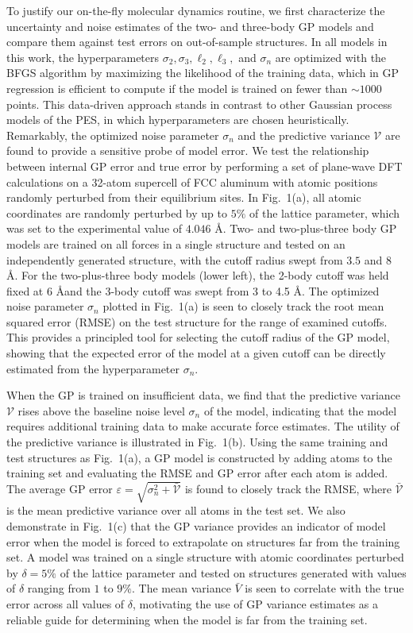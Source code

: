 \documentclass[%
superscriptaddress,
preprint,
linenumbers,
amsmath,amssymb,
aps,
prl,
]{revtex4-1}
\begin{document}
To justify our on-the-fly molecular dynamics routine, we first characterize the uncertainty and noise estimates of the two- and three-body GP models and compare them against test errors on out-of-sample structures. In all models in this work, the hyperparameters $\sigma_2, \sigma_3, \ell_2, \ell_3,$ and $\sigma_n$ are optimized with the BFGS algorithm by maximizing the likelihood of the training data, which in GP regression is efficient to compute if the model is trained on fewer than $\sim 1000$ points. This data-driven approach stands in contrast to other Gaussian process models of the PES, in which hyperparameters are chosen heuristically. Remarkably, the optimized noise parameter $\sigma_n$ and the predictive variance $\mathcal{V}$ are found to provide a sensitive probe of model error. We test the relationship between internal GP error and true error by performing a set of plane-wave DFT calculations on a 32-atom supercell of FCC aluminum with atomic positions randomly perturbed from their equilibrium sites. In Fig.\ 1(a), all atomic coordinates are randomly perturbed by up to $5\%$ of the lattice parameter, which was set to the experimental value of $4.046$ \AA. Two- and two-plus-three body GP models are trained on all forces in a single structure and tested on an independently generated structure, with the cutoff radius swept from $3.5$ and $8$ \AA. For the two-plus-three body models (lower left), the 2-body cutoff was held fixed at $6$ \AA and the 3-body cutoff was swept from 3 to 4.5 \AA. The optimized noise parameter $\sigma_n$ plotted in Fig.\ 1(a) is seen to closely track the root mean squared error (RMSE) on the test structure for the range of examined cutoffs. This provides a principled tool for selecting the cutoff radius of the GP model, showing that the expected error of the model at a given cutoff can be directly estimated from the hyperparameter $\sigma_n$.

When the GP is trained on insufficient data, we find that the predictive variance $\mathcal{V}$ rises above the baseline noise level $\sigma_n$ of the model, indicating that the model requires additional training data to make accurate force estimates. The utility of the predictive variance is illustrated in Fig.\ 1(b). Using the same training and test structures as Fig.\ 1(a), a GP model is constructed by adding atoms to the training set and evaluating the RMSE and GP error after each atom is added. The average GP error $\varepsilon = \sqrt{\sigma_n^2 + \bar{\mathcal{V}}}$ is found to closely track the RMSE, where $\bar{\mathcal{V}}$ is the mean predictive variance over all atoms in the test set. We also demonstrate in Fig.\ 1(c) that the GP variance provides an indicator of model error when the model is forced to extrapolate on structures far from the training set. A model was trained on a single structure with atomic coordinates perturbed by $\delta = 5\%$ of the lattice parameter and tested on structures generated with values of $\delta$ ranging from $1$ to $9\%$. The mean variance $\bar{V}$ is seen to correlate with the true error across all values of $\delta$, motivating the use of GP variance estimates as a reliable guide for determining when the model is far from the training set.
\end{document}
